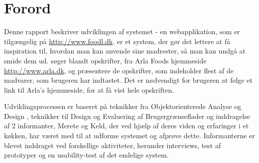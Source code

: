 \chapter*{Forord}
Denne rapport beskriver udviklingen af systemet \Foodl{} - en webapplikation, som er tilgængelig på \url{http://www.foodl.dk}. \Foodl{} er et system, der gør det lettere at få inspiration til, hvordan man kan anvende sine madrester, så man kan undgå at smide dem ud. \Foodl{} søger blandt opskrifter, fra Arla Foods hjemmeside \url{http://www.arla.dk}, og præsentere de opskrifter, som indeholder flest af de madvarer, som brugeren har indtastet. Det er nødvendigt for brugeren at følge et link til Arla's hjemmeside, for at få vist hele opskriften.

Udviklingsprocessen er baseret på teknikker fra Objektorienterede Analyse og Design \cite{ooad}, teknikker til Design og Evaluering af Brugergrænseflader \cite{deb} og inddragelse af 2 informanter, Merete og Keld, der ved hjælp af deres viden og erfaringer i et køkken, har været med til at udforme systemet og afprøve dette. Informanterne er blevet inddraget ved forskellige aktiviteter, herunder interviews, test af prototyper og en usability-test af det endelige system.

